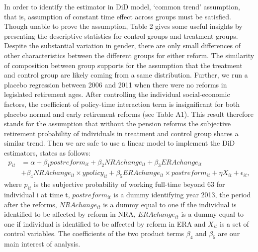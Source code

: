 \documentclass[a4paper]{article}
\begin{document}
In order to identify the estimator in DiD model, ‘common trend’ assumption, that is, assumption of constant time effect across groups must be satisfied. Though unable to prove the assumption, Table 2 gives some useful insights by presenting the descriptive statistics for control groups and treatment groups. Despite the substantial variation in gender, there are only small differences of other characteristics between the different groups for either reform. The similarity of composition between group supports for the assumption that the treatment and control group are likely coming from a same distribution. Further, we run a placebo regression between 2006 and 2011 when there were no reforms in legislated retirement ages. After controlling the individual social-economic factors, the coefficient of policy-time interaction term is insignificant for both placebo normal and early retirement reforms (see Table A1). This result therefore stands for the assumption that without the pension reforms the subjective retirement probability of individuals in treatment and control group shares a similar trend. Then we are safe to use a linear model to implement the DiD estimators, states as follows:
\begin{equation}
\begin{aligned}p_{it}&=\alpha+\beta_1 postreform_{it}+\beta_2 NRAchange_{it}+\beta_3 ERAchange_{it} \\ &+\beta_4 NRAchange_{it}\times ypolicy_{it}+\beta_5 ERAchange_{it}\times postreform_{it}+\eta X_{it}+\epsilon _{it},
\end{aligned}
\end{equation}
where $p_{it}$ is the subjective probability of working full-time beyond 63 for individual i at time t, $postreform_{it}$ is a dummy identifying year 2013, the period after the reforms, $NRAchange_{it}$ is a dummy equal to one if the individual is identified to be affected by reform in NRA, $ERAchange_{it}$ is a dummy equal to one if individual is identified to be affected by reform in ERA and $X_{it}$ is a set of control variables. The coefficients of the two product terms $\beta_4$ and $\beta_5$ are our main interest of analysis. 
\end{document}

